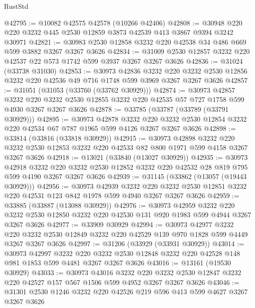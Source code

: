 \begin{lexlean}{RustStd}
\begin{coremodule}
@42795 := @10082 @42575 @42578 (@10266 @42406)
@42808 := @30948 @220 @220 @3232 @445 @2530 @12859 @3873 @42539 @413 @3867 @9394 @3242 @30971
@42821 := @30983 @2530 @12858 @3232 @220 @42538 @34 @486 @669 @599 @3882 @3267 @3267 @3626
@42834 := @31009 @2530 @12857 @3232 @220 @42537 @22 @573 @1742 @599 @3937 @3267 @3267 @3626
@42836 := @31024 (@33738 @31030)
@42853 := @30973
    @42836
    @3232
    @220
    @3232
    @2530
    @12856
    @3232
    @220
    @42536
    @49
    @716
    @1748
    @599
    @3969
    @3267
    @3267
    @3626
@42857 := @31051 (@31053 (@33760 (@33762 @30929)))
@42874 := @30973
    @42857
    @3232
    @220
    @3232
    @2530
    @12855
    @3232
    @220
    @42535
    @57
    @727
    @1758
    @599
    @4930
    @3267
    @3267
    @3626
@42878 := @33785 (@33787 (@33789 (@33791 @30929)))
@42895 := @30973
    @42878
    @3232
    @220
    @3232
    @2530
    @12854
    @3232
    @220
    @42534
    @67
    @787
    @1965
    @599
    @4126
    @3267
    @3267
    @3626
@42898 := @33814 (@33816 (@33818 @30929))
@42915 := @30973
    @42898
    @3232
    @220
    @3232
    @2530
    @12853
    @3232
    @220
    @42533
    @82
    @800
    @1971
    @599
    @4158
    @3267
    @3267
    @3626
@42918 := @13021 (@33840 (@13027 @30929))
@42935 := @30973
    @42918
    @3232
    @220
    @3232
    @2530
    @12852
    @3232
    @220
    @42532
    @28
    @819
    @795
    @599
    @4190
    @3267
    @3267
    @3626
@42939 := @31145 (@33862 (@13057 (@19443 @30929)))
@42956 := @30973
    @42939
    @3232
    @220
    @3232
    @2530
    @12851
    @3232
    @220
    @42531
    @123
    @842
    @1978
    @599
    @4940
    @3267
    @3267
    @3626
@42959 := @33885 (@33887 (@13088 @30929))
@42976 := @30973
    @42959
    @3232
    @220
    @3232
    @2530
    @12850
    @3232
    @220
    @42530
    @131
    @920
    @1983
    @599
    @4944
    @3267
    @3267
    @3626
@42977 := @33909 @30929
@42994 := @30973
    @42977
    @3232
    @220
    @3232
    @2530
    @12849
    @3232
    @220
    @42529
    @139
    @970
    @1828
    @599
    @4449
    @3267
    @3267
    @3626
@42997 := @31206 (@33929 (@33931 @30929))
@43014 := @30973
    @42997
    @3232
    @220
    @3232
    @2530
    @12848
    @3232
    @220
    @42528
    @148
    @981
    @1853
    @599
    @4481
    @3267
    @3267
    @3626
@43016 := @13161 (@19530 @30929)
@43033 := @30973
    @43016
    @3232
    @220
    @3232
    @2530
    @12847
    @3232
    @220
    @42527
    @157
    @567
    @1506
    @599
    @4952
    @3267
    @3267
    @3626
@43046 := @31301 @2530 @1246 @3232 @220 @42526 @219 @596 @413 @599 @4627 @3267 @3267 @3626

\end{coremodule}
\end{lexlean}
